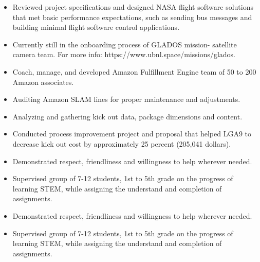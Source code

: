 \documentclass[10pt,a4paper,ragged2e,withhyper]{altacv}
\begin{document}
\begin{paracol}{2}
            \begin{itemize}
                \item Reviewed project specifications and designed NASA flight software solutions that met basic performance expectations, such as sending bus messages and building minimal flight software control applications.
                \item Currently still in the onboarding process of GLADOS mission- satellite camera team. For more info: https://www.ubnl.space/missions/glados.
            \end{itemize}
            \vskip 0.15in
            
            \begin{itemize}
                \item Coach, manage, and developed Amazon Fulfillment Engine team of 50 to 200 Amazon associates.
                \item Auditing Amazon SLAM lines for proper maintenance and adjustments.
                \item Analyzing and gathering kick out data, package dimensions and content.
                \item Conducted process improvement project and proposal that helped LGA9 to decrease kick out cost by approximately 25 percent (205,041 dollars).
            \end{itemize}
            \vskip 0.15in
            
            \begin{itemize}
                \item Demonstrated respect, friendliness and willingness to help wherever needed.
                \item Supervised group of 7-12 students, 1st to 5th grade on the progress of learning STEM, while assigning the understand and completion of assignments.
            \end{itemize}
            \vskip 0.15in
            
            \begin{itemize}
                \item Demonstrated respect, friendliness and willingness to help wherever needed.
                \item Supervised group of 7-12 students, 1st to 5th grade on the progress of learning STEM, while assigning the understand and completion of assignments.
            \end{itemize}
        

\end{paracol}
\end{document}
